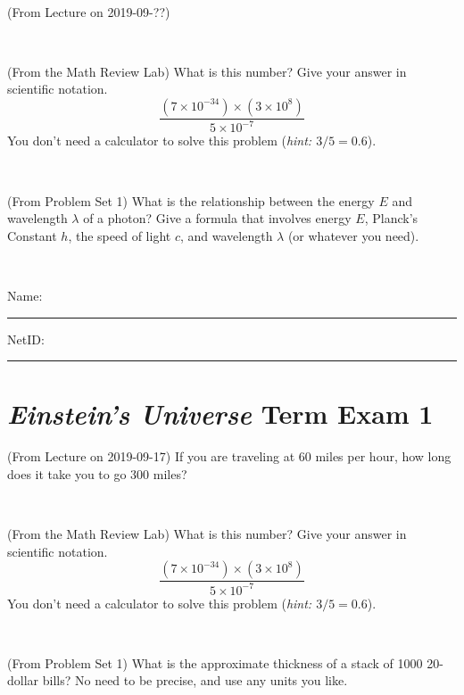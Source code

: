\documentclass[12pt, letterpaper]{article}
\begin{document}
\vfill ~

\begin{problem} (From Lecture on 2019-09-??)
\end{problem}


\vfill ~

\begin{problem} (From the Math Review Lab)
What is this number? Give your answer in scientific notation.
$$
\frac{(7\times10^{-34})\times(3\times10^8)}{5\times10^{-7}}
$$
You don't need a calculator to solve this problem (\textit{hint: $3/5=0.6$}).
\end{problem}


\vfill ~

\begin{problem} (From Problem Set 1)
What is the relationship between the energy $E$ and wavelength
$\lambda$ of a photon? Give a formula that involves energy $E$,
Planck's Constant $h$, the speed of light $c$, and wavelength
$\lambda$ (or whatever you need).
\end{problem}

\vfill ~


\cleardoublepage



\noindent
Name: \rule[-1ex]{0.60\textwidth}{0.1pt}
NetID: \rule[-1ex]{0.20\textwidth}{0.1pt}

\section*{\textsl{Einstein's Universe} Term Exam 1}
\setcounter{problem}{1}


\begin{problem} (From Lecture on 2019-09-17)
If you are traveling at 60 miles per hour, how long does
it take you to go 300 miles?
\end{problem}


\vfill ~

\begin{problem} (From the Math Review Lab)
What is this number? Give your answer in scientific notation.
$$
\frac{(7\times10^{-34})\times(3\times10^8)}{5\times10^{-7}}
$$
You don't need a calculator to solve this problem (\textit{hint: $3/5=0.6$}).
\end{problem}


\vfill ~

\begin{problem} (From Problem Set 1)
What is the approximate thickness of a stack of 1000 20-dollar bills?
No need to be precise, and use any units you like.
\end{problem}
\end{document}
